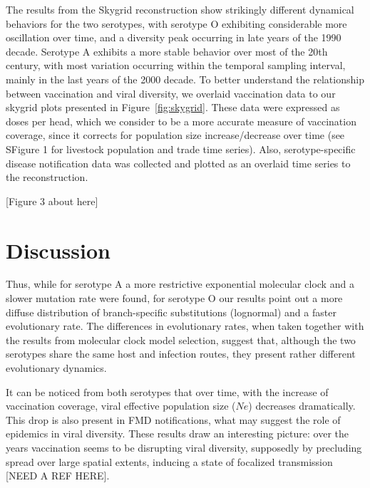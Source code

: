 \documentclass[10pt]{article}
\begin{document}
The results from the Skygrid reconstruction show strikingly different dynamical behaviors for the two serotypes, with serotype O exhibiting considerable more oscillation over time, and a diversity peak occurring in late years of the 1990 decade.
Serotype A exhibits a more stable behavior over most of the 20th century, with most variation occurring within the temporal sampling interval, mainly in the last years of the 2000 decade.
To better understand the relationship between vaccination and viral diversity, we overlaid vaccination data to our skygrid plots presented in Figure~\ref{fig:skygrid}.
These data were expressed as doses per head, which we consider to be a more accurate measure of vaccination coverage, since it corrects for population size increase/decrease over time (see SFigure 1 for livestock population and trade time series).
Also, serotype-specific disease notification data was collected and plotted as an overlaid time series to the reconstruction. 

\begin{center}
 [Figure 3 about here]
\end{center}


\section*{Discussion}
Thus, while for serotype A a more restrictive exponential molecular clock and a slower mutation rate were found, for serotype O our results point out a more diffuse distribution of branch-specific substitutions (lognormal) and a faster evolutionary rate.
The differences in evolutionary rates, when taken together with the results from molecular clock model selection, suggest that, although the two serotypes share the same host and infection routes, they present rather different evolutionary dynamics. 

It can be noticed from both serotypes that over time, with the increase of vaccination coverage, viral effective population size ($Ne$) decreases dramatically.
This drop is also present in FMD notifications, what may suggest the role of epidemics in viral diversity.
These results draw an interesting picture: over the years vaccination seems to be disrupting viral diversity, supposedly by precluding spread over large spatial extents, inducing a state of focalized transmission [NEED A REF HERE].
\end{document}
